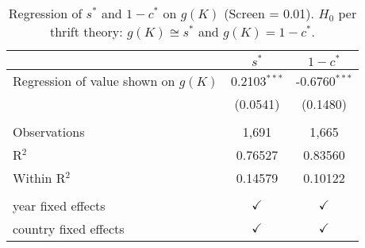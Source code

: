 \begin{table}[pos=h]
\caption{Regression of \(s^*\) and \(1-c^*\) on \(g(K)\) (Screen = 0.01). \(H_0\) per thrift theory: \(g(K) \cong s^*\) and \(g(K) = 1 - c^*\).}
\centering
\begin{tabularx}{\columnwidth}{lcc}
   \toprule
                                           & $s^*$          & $1-c^*$ \\   
   \midrule 
   Regression of value shown on \(g(K)\)   & 0.2103$^{***}$ & -0.6760$^{***}$\\   
                                           & (0.0541)       & (0.1480)\\   
    \\
   Observations                            & 1,691          & 1,665\\  
   R$^2$                                   & 0.76527        & 0.83560\\  
   Within R$^2$                            & 0.14579        & 0.10122\\  
    \\
   year fixed effects                      & $\checkmark$   & $\checkmark$\\   
   country fixed effects                   & $\checkmark$   & $\checkmark$\\   
   \bottomrule
\end{tabularx}
   \label{tbl-4}
\end{table}